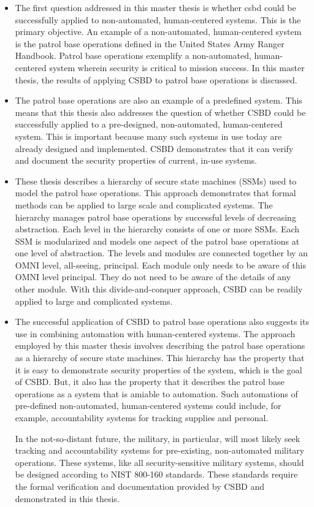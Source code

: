 \documentclass[../../main/main.tex]{subfiles}
\begin{document}
\begin{itemize}
\item The first question addressed in this master thesis is whether \gls{csbd} could be successfully applied to non-automated, human-centered systems.  This is the primary objective.  An example of a non-automated, human-centered system is the patrol base operations defined in the United States Army Ranger Handbook\cite{rangermanual}.   Patrol base operations exemplify a non-automated, human-centered system wherein security is critical to mission success.  In this master thesis, the results of applying CSBD to patrol base operations is discussed. 

\item The patrol base operations are also an example of a predefined system.  This means that this thesis also addresses the question of whether CSBD could be successfully applied to a pre-designed, non-automated, human-centered system.  This is important because many such systems in use today are already designed and implemented.  CSBD demonstrates that it can verify and document the security properties of current, in-use systems.  

\item These thesis describes a hierarchy of secure state machines (SSMs) used to model the patrol base operations.  This approach demonstrates that formal methods can be applied to large scale and complicated systems.  The hierarchy manages patrol base operations by successful levels of decreasing abstraction.  Each level in the hierarchy consists of one or more SSMs.  Each SSM is modularized and models one aspect of the patrol base operations at one level of abstraction.  The levels and modules are connected together by an OMNI level, all-seeing, principal.  Each module only needs to be aware of this OMNI level principal.  They do not need to be aware of the details of any other module.  With this divide-and-conquer approach, CSBD can be readily applied to large and complicated systems.

\item The successful application of CSBD to patrol base operations also suggests its use in combining automation with human-centered systems.  The approach employed by this master thesis involves describing the patrol base operations as a hierarchy of secure state machines.  This hierarchy has the property that it is easy to demonstrate security properties of the system, which is the goal of CSBD.  But, it also has the property that it describes the patrol base operations as a system that is amiable to automation.  Such automations of pre-defined non-automated, human-centered systems could include, for example, accountability systems for tracking supplies and personal.  

In the not-so-distant future, the military, in particular, will most likely seek tracking and accountability systems for pre-existing, non-automated military operations.  These systems, like all security-sensitive military systems, should be designed according to NIST 800-160 standards.  These standards require the formal verification and documentation provided by CSBD and demonstrated in this thesis.   

\end{itemize}
\end{document}
